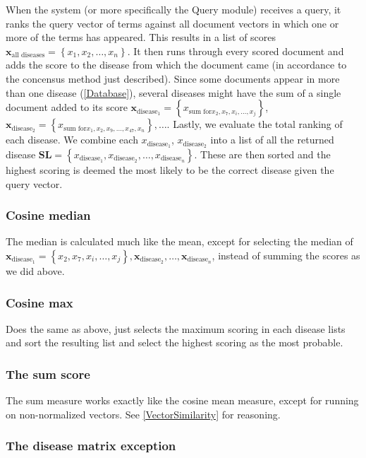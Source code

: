 When the system (or more specifically the Query module) receives a
query, it ranks the query vector of terms against all document vectors
in which one or more of the terms has appeared. This results in a list
of scores $\mathbf{x}_{\textrm{all diseases}} = \left\{x_1, x_2,
\dots, x_n \right\}$. It then runs through every scored document and
adds the score to the disease from which the document came (in
accordance to the concensus method just described). Since some
documents appear in more than one disease (\ref{Database}), several
diseases might have the sum of a single document added to its score
$\mathbf{x}_{\textrm{disease}_{1}} = \left\{x_{\textrm{sum for} x_2,
  x_7, x_i, \dots, x_j}\right\}$, $\mathbf{x}_{\textrm{disease}_{2}} =
\left\{x_{\textrm{sum for} x_1, x_2, x_9, \dots, x_47, x_n}\right\},
\dots$.  Lastly, we evaluate the total ranking of each disease. We
combine each $x_{\textrm{disease}_1}$, $x_{\textrm{disease}_2}$ into a
list of all the returned disease $\mathbf{SL} =
\left\{x_{\textrm{disease}_1},x_{\textrm{disease}_2}, \dots,
x_{\textrm{disease}_n}\right\}$. These are then sorted and the highest
scoring is deemed the most likely to be the correct disease given the
query vector.

\subsubsection{Cosine median}
The median is calculated much like the mean, except for selecting the
median of $\mathbf{x}_{\textrm{disease}_{1}} = \left\{x_2,x_7, x_i,
\dots, x_j\right\}, \mathbf{x}_{\textrm{disease}_{2}}, \dots,
\mathbf{x}_{\textrm{disease}_{n}}$, instead of summing the scores as
we did above.

\subsubsection{Cosine max}
Does the same as above, just selects the maximum scoring in each
disease lists and sort the resulting list and select the highest
scoring as the most probable.

\subsubsection{The sum score}

The sum measure works exactly like the cosine mean measure, except for
running on non-normalized vectors. See \ref{VectorSimilarity} for
reasoning.

\subsubsection{The disease matrix exception}

